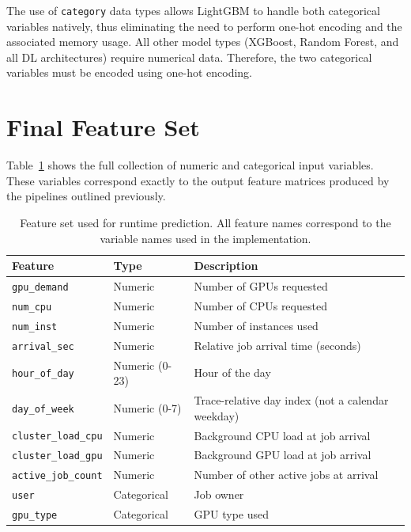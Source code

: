 The use of \texttt{category} data types allows LightGBM to handle both categorical variables natively, thus eliminating the need to perform one-hot encoding and the associated memory usage. All other model types (XGBoost, Random Forest, and all DL architectures) require numerical data. Therefore, the two categorical variables must be encoded using one-hot encoding.

\section{Final Feature Set}

Table~\ref{tab:features} shows the full collection of numeric and categorical input variables. These variables correspond exactly to the output feature matrices produced by the pipelines outlined previously.

\begin{table}[htbp]
\centering
\caption[Feature set definition]{Feature set used for runtime prediction. All feature names correspond to the variable names used in the implementation.}
\label{tab:features}
\begin{tabular}{lll}
\hline
\textbf{Feature} & \textbf{Type} & \textbf{Description} \\ 
\hline
\texttt{gpu\_demand} & Numeric & Number of GPUs requested \\ 
\texttt{num\_cpu} & Numeric & Number of CPUs requested \\ 
\texttt{num\_inst} & Numeric & Number of instances used \\ 
\texttt{arrival\_sec} & Numeric & Relative job arrival time (seconds) \\ 
\texttt{hour\_of\_day} & Numeric (0-23) & Hour of the day \\ 
\texttt{day\_of\_week} & Numeric (0-7) & Trace-relative day index (not a calendar weekday) \\
\texttt{cluster\_load\_cpu} & Numeric & Background CPU load at job arrival \\ 
\texttt{cluster\_load\_gpu} & Numeric & Background GPU load at job arrival \\ 
\texttt{active\_job\_count} & Numeric & Number of other active jobs at arrival \\ 
\texttt{user} & Categorical & Job owner \\ 
\texttt{gpu\_type} & Categorical & GPU type used \\ 
\hline
\end{tabular}
\end{table}

